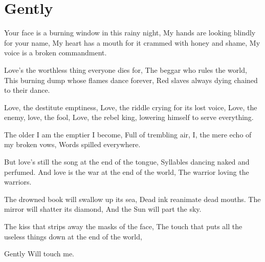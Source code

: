 \documentclass[english,11pt,letterpaper,onecolumn]{scrbook}
\begin{document}
\newpage
\section{Gently}

\begin{poem}
\begin{stanza}
Your face is a burning window in this rainy night,\verseline
My hands are looking blindly for your name,\verseline
My heart has a mouth for it crammed with honey and shame,\verseline
My voice is a broken commandment.
\end{stanza}

\begin{stanza}
Love's the worthless thing everyone dies for,\verseline
The beggar who rules the world,\verseline
This burning dump whose flames dance forever,\verseline
Red slaves always dying chained to their dance.
\end{stanza}

\begin{stanza}
Love, the destitute emptiness,\verseline
Love, the riddle crying for its lost voice,\verseline
Love, the enemy, love, the fool,\verseline
Love, the rebel king, lowering himself to serve everything.
\end{stanza}

\begin{stanza}
The older I am the emptier I become,\verseline
Full of trembling air,\verseline
I, the mere echo of my broken vows,\verseline
Words spilled everywhere.
\end{stanza}

\begin{stanza}
But love's still the song at the end of the tongue,\verseline
Syllables dancing naked and perfumed.\verseline
And love is the war at the end of the world,\verseline
The warrior loving the warriors.
\end{stanza}

\begin{stanza}
The drowned book will swallow up its sea,\verseline
Dead ink reanimate dead mouths.\verseline
The mirror will shatter its diamond,\verseline
And the Sun will part the sky.
\end{stanza}

\begin{stanza}
The kiss that strips away the masks of the face,\verseline
The touch that puts all the useless things down at the end of the world,
\end{stanza}

\begin{stanza}
Gently\verseline
Will touch me.	
\end{stanza}
\end{poem}
\end{document}
